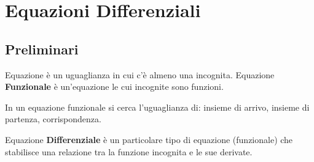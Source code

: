 \chapter{Equazioni Differenziali}
\section{Preliminari}
Equazione è un uguaglianza in cui c'è almeno una incognita.\newline
Equazione \textbf{Funzionale} è un’equazione le cui incognite sono funzioni.
\begin{note}
	In un equazione funzionale si cerca l'uguaglianza di: insieme di arrivo, insieme di partenza, corrispondenza.
\end{note}
Equazione \textbf{Differenziale} è un particolare tipo di equazione (funzionale) che stabilisce una relazione tra la funzione incognita e le sue derivate.

